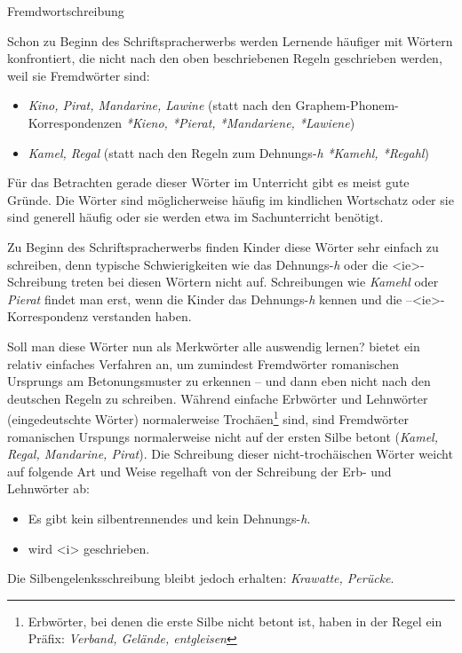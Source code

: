 \begin{Exkurs}{Fremdwortschreibung}

\noindent Schon zu Beginn des Schriftspracherwerbs werden Lernende häufiger mit Wörtern konfrontiert, die nicht nach den oben beschriebenen Regeln geschrieben werden, weil sie Fremdwörter sind:

\begin{itemize}
    \item \textit{Kino, Pirat, Mandarine, Lawine} (statt nach den Graphem-Phonem-Korres\-pondenzen \textit{*Kieno, *Pierat, *Mandariene, *Lawiene})
    \item \textit{Kamel, Regal} (statt nach den Regeln zum Dehnungs-\textit{h} \textit{*Kamehl, *Regahl})
\end{itemize}

Für das Betrachten gerade dieser Wörter im Unterricht gibt es meist gute Gründe. Die Wörter sind möglicherweise häufig im kindlichen Wortschatz oder sie sind generell häufig oder sie werden etwa im Sachunterricht benötigt. 

Zu Beginn des Schriftspracherwerbs finden Kinder diese Wörter sehr einfach zu schreiben, denn typische Schwierigkeiten wie das Dehnungs-\textit{h} oder die <ie>-Schreibung treten bei diesen Wörtern nicht auf. Schreibungen wie \textit{Kamehl} oder \textit{Pierat} findet man erst, wenn die Kinder das Dehnungs-\textit{h} kennen und die --<ie>-Korrespondenz verstanden haben. 

Soll man diese Wörter nun als Merkwörter alle auswendig lernen? \citet{Bredel2011} bietet ein relativ einfaches Verfahren an, um zumindest Fremdwörter romanischen Ursprungs am Betonungsmuster zu erkennen -- und dann eben nicht nach den deutschen Regeln zu schreiben. Während einfache Erbwörter und Lehnwörter (eingedeutschte Wörter) normalerweise Trochäen\footnote{Erbwörter, bei denen die erste Silbe nicht betont ist, haben in der Regel ein Präfix: \textit{Verband, Gelände, entgleisen}} sind, sind Fremdwörter romanischen Urspungs normalerweise nicht auf der ersten Silbe betont (\textit{Kamel, Regal, Mandarine, Pirat}). Die Schreibung dieser nicht-trochäischen Wörter weicht auf folgende Art und Weise regelhaft von der Schreibung der Erb- und Lehnwörter ab:

\begin{itemize}
    \item Es gibt kein silbentrennendes und kein Dehnungs-\textit{h}.
    \item \textipa{[i]} wird <i> geschrieben.
\end{itemize}

Die Silbengelenksschreibung bleibt jedoch erhalten: \textit{Krawatte, Perücke}.

\end{Exkurs}


